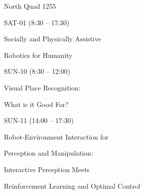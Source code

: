 \documentclass{article}
\begin{document}
\rssheader[2in]

\rssbig
\begin{center}
North Quad 1255
\end{center}

\vfill

\rssmed
\begin{center}
SAT-01 (8:30 -- 17:30)
\end{center}

\rsssm
\begin{center}
Socially and Physically Assistive \par \noindent Robotics for Humanity
\end{center}

\vfill

\rssmed
\begin{center}
SUN-10 (8:30 -- 12:00)
\end{center}

\rsssm
\begin{center}
Visual Place Recognition: \par \noindent What is it Good For?
\end{center}

\vfill

\rssmed
\begin{center}
SUN-11 (14:00 -- 17:30)
\end{center}

\rsssm
\begin{center}
Robot-Environment Interaction for \par \noindent
Perception and Manipulation: \par \noindent
Interactive Perception Meets \par \noindent
Reinforcement Learning and Optimal Control
\end{center}


\vfill
\end{document}
